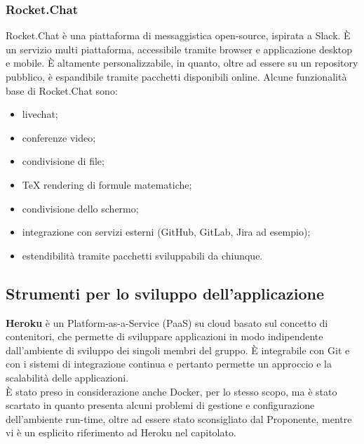 \subsubsection{Rocket.Chat}
Rocket.Chat è una piattaforma di messaggistica open-source, ispirata a Slack. È un servizio multi piattaforma, accessibile tramite browser e applicazione desktop e mobile. È altamente personalizzabile, in quanto, oltre ad essere su un repository pubblico, è espandibile tramite pacchetti disponibili online. Alcune funzionalità base di Rocket.Chat sono:
\begin{itemize}
	\item livechat;
	\item conferenze video;
	\item condivisione di file;
	\item TeX rendering di formule matematiche;
	\item condivisione dello schermo;
	\item integrazione con servizi esterni (GitHub, GitLab, Jira ad esempio);
	\item estendibilità tramite pacchetti sviluppabili da chiunque.
\end{itemize}

\subsection{Strumenti per lo sviluppo dell'applicazione}
\textbf{Heroku} è un Platform-as-a-Service (PaaS) su cloud basato sul concetto di contenitori, che permette di sviluppare applicazioni in modo indipendente dall'ambiente di sviluppo dei singoli membri del gruppo. È integrabile con Git e con i sistemi di integrazione continua e pertanto permette un approccio  e la scalabilità delle applicazioni.\\
È stato preso in considerazione anche Docker, per lo stesso scopo, ma è stato scartato in quanto presenta alcuni problemi di gestione e configurazione dell'ambiente run-time, oltre ad essere stato sconsigliato dal Proponente, mentre vi è un esplicito riferimento ad Heroku nel capitolato.

